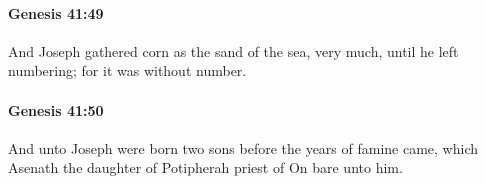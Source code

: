 		\paragraph{Genesis 41:49} %
			\label{GENESIS-41-49}

			And Joseph gathered corn as the sand of the sea, very much, until he left numbering; for it was without number.


		\paragraph{Genesis 41:50} %
			\label{GENESIS-41-50}

			And unto Joseph were born two sons before the years of famine came, which Asenath the daughter of Potipherah priest of On bare unto him.


